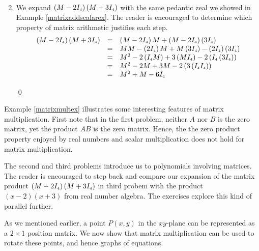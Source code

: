 \documentclass{ximera}
\begin{document}
\begin{example}
\begin{enumerate}
\[\begin{array}{rcl}
\end{array} \]

\item  We expand $\left(M - 2I_{\mbox{\tiny$4$}}\right)\left(M + 3I_{\mbox{\tiny$4$}}\right)$ with the same pedantic zeal we showed in Example \ref{matrixaddscalarex}. The reader is encouraged to determine which property of matrix arithmetic justifies each step.
\[\begin{array}{rcl}

\left(M - 2I_{\mbox{\tiny$4$}}\right)\left(M + 3I_{\mbox{\tiny$4$}}\right) & = & \left(M - 2I_{\mbox{\tiny$4$}}\right) M + \left(M - 2I_{\mbox{\tiny$4$}}\right)\left( 3I_{\mbox{\tiny$4$}}\right) \\
& = & MM - \left(2I_{\mbox{\tiny$4$}}\right)M + M\left( 3I_{\mbox{\tiny$4$}}\right) - \left( 2I_{\mbox{\tiny$4$}}\right)\left( 3I_{\mbox{\tiny$4$}}\right) \\
& = & M^2 -2 \left(I_{\mbox{\tiny$4$}}M\right) +3\left( M I_{\mbox{\tiny$4$}}\right) - 2\left( I_{\mbox{\tiny$4$}}\left( 3I_{\mbox{\tiny$4$}}\right)\right) \\
& = & M^2 - 2M  + 3M - 2\left(3\left( I_{\mbox{\tiny$4$}}I_{\mbox{\tiny$4$}}\right)\right) \\
& = & M^2 +M  - 6I_{\mbox{\tiny$4$}}  \\

\end{array}\]

\qed
\end{enumerate}

\end{example}

Example \ref{matrixmultex} illustrates some interesting features of matrix multiplication.  First note that in the first problem, neither $A$ nor $B$ is the zero matrix, yet the product $AB$ is the zero matrix.  Hence, the the zero product property enjoyed by real numbers and scalar multiplication does not hold for matrix multiplication. 

The second and third problems  introduce us to polynomials involving matrices.  The reader is encouraged to step back and compare our expansion of the matrix product $\left(M - 2I_{\mbox{\tiny$4$}}\right)\left(M + 3I_{\mbox{\tiny$4$}}\right)$ in third probem with the product $(x-2)(x+3)$ from real number algebra.  The exercises explore this kind of parallel further.  

\smallskip

As we mentioned earlier, a point $P(x,y)$ in the $xy$-plane can be represented as a $2 \times 1$ position matrix.  We now show that matrix multiplication can be used to rotate these points, and hence graphs of equations.
\end{document}
